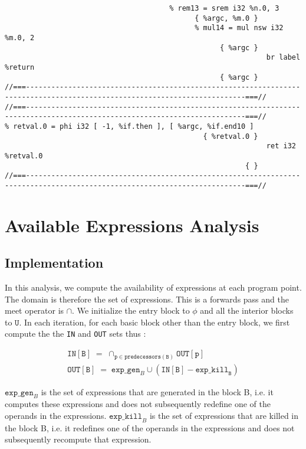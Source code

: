 \begin{verbatim}
                                       % rem13 = srem i32 %n.0, 3
                                             { %argc, %m.0 }
                                             % mul14 = mul nsw i32 %m.0, 2
                                                   { %argc }
                                                              br label %return
                                                   { %argc }
//===--------------------------------------------------------------------------------------------------------------------------===//
//===--------------------------------------------------------------------------------------------------------------------------===//
% retval.0 = phi i32 [ -1, %if.then ], [ %argc, %if.end10 ]
                                               { %retval.0 }
                                                              ret i32 %retval.0
                                                         { }
//===--------------------------------------------------------------------------------------------------------------------------===//
\end{verbatim}
\endgroup

\section{Available Expressions Analysis}

\subsection{Implementation}

In this analysis, we compute the availability of expressions at each program point.
The domain is therefore the set of expressions.
This is a forwards pass and the meet operator is $\cap$.
We initialize the entry block to $\phi$  and all the interior blocks to $\mathtt{U}$.
In each iteration, for each basic block other than the entry block, we
first compute the the \texttt{IN} and \texttt{OUT} sets thus :

\begin{align*}
\texttt{IN}[\mathtt{B}] \; = \; \cap_{\mathtt{p} \in \texttt{predecessors}(\mathtt{B})} \texttt{OUT}[\texttt{p}] \\
\texttt{OUT}[\mathtt{B}] \; = \; \texttt{exp\_gen}_{B} \cup (\texttt{IN}[\mathtt{B}] - \texttt{exp\_kill}_{\texttt{B}})
\end{align*}

$\texttt{exp\_gen}_{B}$ is the set of expressions that are generated in the block B, i.e. it computes these
expressions and does not subsequently redefine one of the operands in the expressions.
$\texttt{exp\_kill}_{B}$ is the set of expressions that are killed in the block B, i.e. it
redefines one of the operands in the expressions and does not subsequently recompute that expression.


